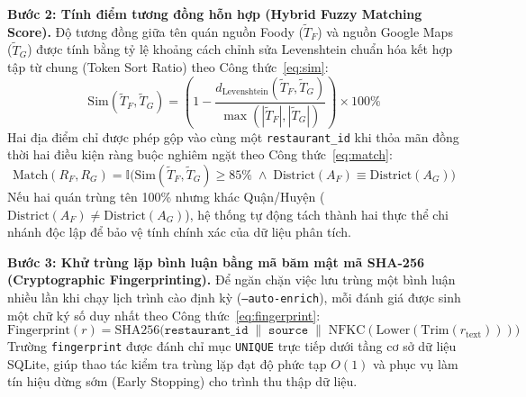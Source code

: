 \documentclass[12pt, a4paper]{article}
\begin{document}
\textbf{Bước 2: Tính điểm tương đồng hỗn hợp (Hybrid Fuzzy Matching Score).}
Độ tương đồng giữa tên quán nguồn Foody ($\tilde{T}_F$) và nguồn Google Maps ($\tilde{T}_G$) được tính bằng tỷ lệ khoảng cách chỉnh sửa Levenshtein chuẩn hóa kết hợp tập từ chung (Token Sort Ratio) theo Công thức~\eqref{eq:sim}:
\begin{equation}
\label{eq:sim}
    \text{Sim}(\tilde{T}_F, \tilde{T}_G) = \left( 1 - \frac{d_{\text{Levenshtein}}(\tilde{T}_F, \tilde{T}_G)}{\max\left(|\tilde{T}_F|, |\tilde{T}_G|\right)} \right) \times 100\%
\end{equation}
Hai địa điểm chỉ được phép gộp vào cùng một \texttt{restaurant\_id} khi thỏa mãn đồng thời hai điều kiện ràng buộc nghiêm ngặt theo Công thức~\eqref{eq:match}:
\begin{equation}
\label{eq:match}
    \text{Match}(R_F, R_G) = \mathbb{I}\Big( \text{Sim}(\tilde{T}_F, \tilde{T}_G) \ge 85\% \;\wedge\; \text{District}(A_F) \equiv \text{District}(A_G) \Big)
\end{equation}
Nếu hai quán trùng tên 100\% nhưng khác Quận/Huyện ($\text{District}(A_F) \neq \text{District}(A_G)$), hệ thống tự động tách thành hai thực thể chi nhánh độc lập để bảo vệ tính chính xác của dữ liệu phân tích.

\textbf{Bước 3: Khử trùng lặp bình luận bằng mã băm mật mã SHA-256 (Cryptographic Fingerprinting).}
Để ngăn chặn việc lưu trùng một bình luận nhiều lần khi chạy lịch trình cào định kỳ (\texttt{--auto-enrich}), mỗi đánh giá được sinh một chữ ký số duy nhất theo Công thức~\eqref{eq:fingerprint}:
\begin{equation}
\label{eq:fingerprint}
    \text{Fingerprint}(r) = \text{SHA256}\Big( \texttt{restaurant\_id} \;\|\; \texttt{source} \;\|\; \text{NFKC}(\text{Lower}(\text{Trim}(r_{\text{text}}))) \Big)
\end{equation}
Trường \texttt{fingerprint} được đánh chỉ mục \texttt{UNIQUE} trực tiếp dưới tầng cơ sở dữ liệu SQLite, giúp thao tác kiểm tra trùng lặp đạt độ phức tạp $O(1)$ và phục vụ làm tín hiệu dừng sớm (Early Stopping) cho trình thu thập dữ liệu.
\end{document}
